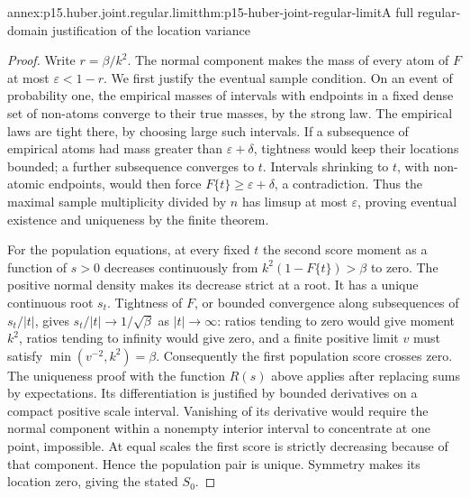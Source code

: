 \begin{annexitem}{annex:p15.huber.joint.regular.limit}{thm:p15-huber-joint-regular-limit}{A full regular-domain justification of the location variance}
\begin{proof}
Write \(r=\beta/k^2\). The normal component makes the mass of
every atom of \(F\) at most \(\varepsilon<1-r\).
We first justify the eventual sample condition. On an event of
probability one, the empirical masses of intervals with endpoints
in a fixed dense set of non-atoms converge to their true masses,
by the strong law. The empirical laws are tight there, by choosing
large such intervals. If a subsequence of empirical atoms had
mass greater than \(\varepsilon+\delta\), tightness would keep
their locations bounded; a further subsequence converges to \(t\).
Intervals shrinking to \(t\), with non-atomic endpoints, would then
force \(F\{t\}\geq\varepsilon+\delta\), a contradiction.
Thus the maximal sample multiplicity divided by \(n\) has limsup
at most \(\varepsilon\), proving eventual existence and uniqueness
by the finite theorem.

For the population equations, at every fixed \(t\) the second
score moment as a function of \(s>0\) decreases continuously from
\(k^2(1-F\{t\})>\beta\) to zero. The positive normal density
makes its decrease strict at a root. It has a unique continuous
root \(s_t\). Tightness of \(F\), or bounded convergence along
subsequences of \(s_t/|t|\), gives \(s_t/|t|\to1/\sqrt\beta\)
as \(|t|\to\infty\): ratios tending to zero would give moment
\(k^2\), ratios tending to infinity would give zero, and a finite
positive limit \(v\) must satisfy \(\min(v^{-2},k^2)=\beta\).
Consequently the first population score crosses zero.
The uniqueness proof with the function \(R(s)\) above applies
after replacing sums by expectations. Its differentiation is
justified by bounded derivatives on a compact positive scale
interval. Vanishing of its derivative would require the normal
component within a nonempty interior interval to concentrate at
one point, impossible. At equal scales the first score is strictly
decreasing because of that component. Hence the population pair
is unique. Symmetry makes its location zero, giving the stated \(S_0\).


\end{proof}
\end{annexitem}
